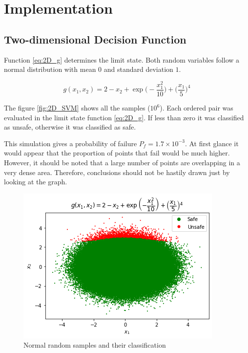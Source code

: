 \chapter{Implementation}\label{ch:implementation}


\section{Two-dimensional Decision Function} \label{sec:2D}

Function \ref{eq:2D_g} determines the limit state. Both random variables follow a normal distribution with mean \(0\) and standard deviation \(1\).

\begin{equation} \label{eq:2D_g}
	g(x_1, x_2) = 2 - x_2 + \exp{\bigg ( - \frac{x_1^2}{10} \bigg )} + \bigg ( \frac{x_1}{5} \bigg )^4
\end{equation}

The figure \ref{fig:2D_SVM} shows all the samples (\(10^6\)). Each ordered pair was evaluated in the limit state function \ref{eq:2D_g}. If less than zero it was classified as unsafe, otherwise it was classified as safe.

This simulation gives a probability of failure \(P_f = 1.7 \times 10^{-3}\). At first glance it would appear that the proportion of points that fail would be much higher. However, it should be noted that a large number of points are overlapping in a very dense area. Therefore, conclusions should not be hastily drawn just by looking at the graph.


\begin{figure}
	\myfloatalign
	\includegraphics[width=0.7\linewidth]{gfx/2D_MCS}
	\caption{Normal random samples and their classification}
	\label{fig:2dmcs}
\end{figure}

